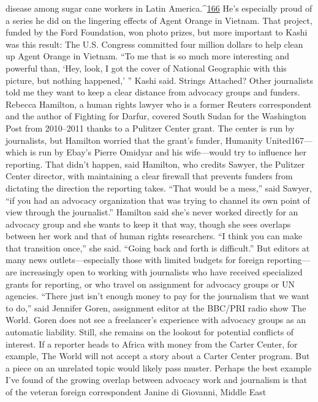 disease among sugar cane workers in Latin America.^{\href{#endnotes}{166}} He’s especially proud of a series
he did on the lingering effects of Agent Orange in Vietnam. That project, funded by the
Ford Foundation, won photo prizes, but more important to Kashi was this result: The U.S.
Congress committed four million dollars to help clean up Agent Orange in Vietnam. ``To
me that is so much more interesting and powerful than, ‘Hey, look, I got the cover of
National Geographic with this picture, but nothing happened,’ '' Kashi said.
Strings Attached?
Other journalists told me they want to keep a clear distance from advocacy groups and
funders. Rebecca Hamilton, a human rights lawyer who is a former Reuters
correspondent and the author of Fighting for Darfur, covered South Sudan for the
Washington Post from 2010–2011 thanks to a Pulitzer Center grant. The center is run by
journalists, but Hamilton worried that the grant’s funder, Humanity United167—which is
run by Ebay’s Pierre Omidyar and his wife—would try to influence her reporting.
That didn’t happen, said Hamilton, who credits Sawyer, the Pulitzer Center director, with
maintaining a clear firewall that prevents funders from dictating the direction the
reporting takes. ``That would be a mess,'' said Sawyer, ``if you had an advocacy
organization that was trying to channel its own point of view through the journalist.''
Hamilton said she’s never worked directly for an advocacy group and she wants to keep
it that way, though she sees overlaps between her work and that of human rights
researchers. ``I think you can make that transition once,'' she said. ``Going back and forth
is difficult.''
But editors at many news outlets—especially those with limited budgets for foreign
reporting—are increasingly open to working with journalists who have received
specialized grants for reporting, or who travel on assignment for advocacy groups or UN
agencies. ``There just isn’t enough money to pay for the journalism that we want to do,''
said Jennifer Goren, assignment editor at the BBC/PRI radio show The World.
Goren does not see a freelancer’s experience with advocacy groups as an automatic
liability. Still, she remains on the lookout for potential conflicts of interest. If a reporter
heads to Africa with money from the Carter Center, for example, The World will not
accept a story about a Carter Center program. But a piece on an unrelated topic would
likely pass muster.
Perhaps the best example I’ve found of the growing overlap between advocacy work and
journalism is that of the veteran foreign correspondent Janine di Giovanni, Middle East
